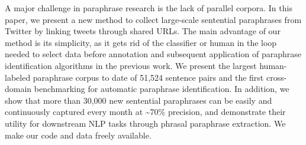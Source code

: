 A major challenge in paraphrase research is the lack of parallel corpora. In this paper, we present a new method to collect large-scale sentential paraphrases from Twitter by linking tweets through shared URLs. The main advantage of our method is its simplicity, as it gets rid of the classifier or human in the loop needed to select data before annotation and subsequent application of paraphrase identification algorithms in the previous work. We present the largest human-labeled paraphrase corpus to date of 51,524 sentence pairs and the first cross-domain benchmarking for automatic paraphrase identification. In addition, we show that more than 30,000 new sentential paraphrases can be easily and continuously captured every month at {\textasciitilde}70\% precision, and demonstrate their utility for downstream NLP tasks through phrasal paraphrase extraction. We make our code and data freely available.
